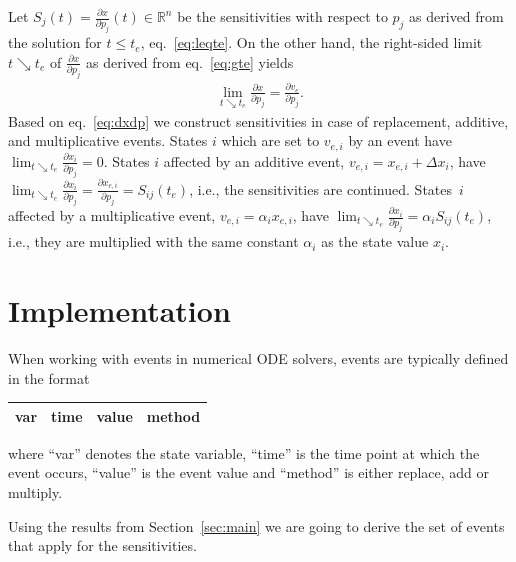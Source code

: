 \documentclass[journal, a4paper]{IEEEtran}
\begin{document}
Let 
$S_j(t) = \frac{\partial x}{\partial p_j}(t) \in \mathbb R^n$
be the sensitivities with respect to $p_j$ as derived from the solution for $t \leq t_e$, eq.~\eqref{eq:leqte}. On the other hand, the right-sided limit $t\searrow t_e$ of $\frac{\partial x}{\partial p_j}$ as derived from eq.~\eqref{eq:gte} yields 
\begin{align}
    \lim_{t\searrow t_e}\frac{\partial x}{\partial p_j} = \frac{\partial v_e}{\partial p_j}.
    \label{eq:dxdp}
\end{align}
Based on eq.~\eqref{eq:dxdp} we construct sensitivities in case of replacement, additive, and multiplicative events. States $i$ which are set to $v_{e, i}$ by an event have $\lim_{t\searrow t_e}\frac{\partial x_i}{\partial p_j} = 0$. States $i$ affected by an additive event, $v_{e, i} = x_{e, i} + \Delta x_i$, have $\lim_{t\searrow t_e}\frac{\partial x_i}{\partial p_j} = \frac{\partial x_{e, i}}{\partial p_j} = S_{ij}(t_e)$, i.e., the sensitivities are continued. States~$i$ affected by a multiplicative event, $v_{e, i} = \alpha_i x_{e, i}$, have $\lim_{t\searrow t_e}\frac{\partial x_i}{\partial p_j} = \alpha_i S_{ij}(t_e)$, i.e., they are multiplied with the same constant $\alpha_i$ as the state value $x_i$.


\section{Implementation}


When working with events in numerical ODE solvers, events are typically defined in the format
\begin{center}
\begin{tabular}{|c|c|c|c|}\hline
     var & time & value & method \\
     \hline
\end{tabular}
\end{center}
where ``var'' denotes the state variable, ``time'' is the time point at which the event occurs, ``value'' is the event value and ``method'' is either replace, add or multiply.
	
Using the results from Section~\ref{sec:main} we are going to derive the set of events that apply for the sensitivities.
\end{document}
